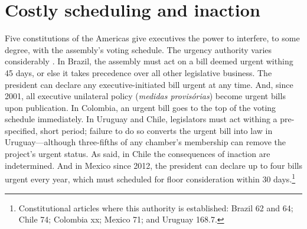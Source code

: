 \documentclass[letter,12pt]{article}
\newcommand{\emm}[1]{\todo[color=blue!30, inline]{\textbf{To do:} #1}}
\begin{document}


\section{Costly scheduling and inaction}

Five constitutions of the Americas give executives the power to interfere, to some degree, with the assembly's voting schedule. The urgency authority varies considerably \citep[][:437]{morgenstern.2002b}. In Brazil, the assembly must act on a bill deemed urgent withing 45 days, or else it takes precedence over all other legislative business. The president can declare any executive-initiated bill urgent at any time. And, since 2001, all executive unilateral policy (\emph{medidas provis\'orias}) become urgent bills upon publication. In Colombia, an urgent bill goes to the top of the voting schedule immediately. In Uruguay and Chile, legislators must act withing a pre-specified, short period; failure to do so converts the urgent bill into law in Uruguay---although three-fifths of any chamber's membership can remove the project's urgent status. As said, in Chile the consequences of inaction are indetermined. And in Mexico since 2012, the president can declare up to four bills urgent every year, which must scheduled for floor consideration within 30 days.\footnote{Constitutional articles where this authority is established: Brazil 62 and 64; Chile 74; Colombia xx; Mexico 71; and Uruguay 168.7.}

\end{document}
